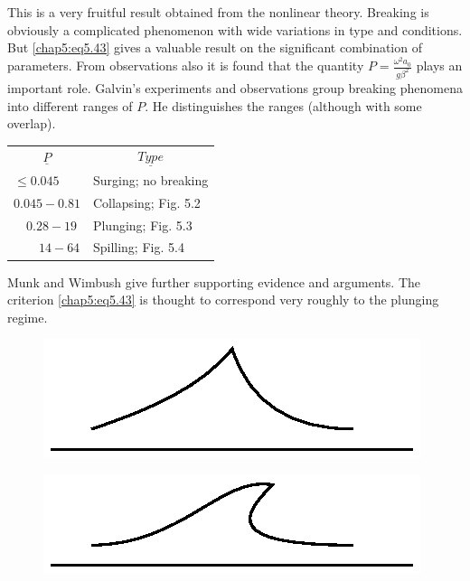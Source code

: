This is a very fruitful result obtained from the nonlinear theory. Breaking is obviously a complicated phenomenon with wide variations in type and conditions. But \eqref{chap5:eq5.43} gives a valuable result on the significant combination of parameters. From observations also it is found that the quantity $P=\frac{\omega^2a_0}{g\beta^2}$ plays an important role. Galvin's experiments and observations \cite{key5} group breaking phenomena into different ranges of $P$. He distinguishes the ranges (although with some overlap).
\begin{center}
\begin{tabular}{ll}
\multicolumn{1}{c}{$\underline{P}$} & \multicolumn{1}{c}{$\underline{Type}$}\\
$\leq 0.045$ & Surging; no breaking\\
$0.045 - 0.81$ & Collapsing; Fig. 5.2\\
$\quad0.28 - 19$ & Plunging; Fig. 5.3\\
$\qquad14 - 64$ & Spilling; Fig. 5.4
\end{tabular}
\end{center}

Munk and Wimbush \cite{key6} give further supporting evidence and arguments. The criterion \eqref{chap5:eq5.43} is thought to correspond very roughly to the plunging regime.

\begin{figure}[H]
\centering
\includegraphics{figures/fig61-5.2.eps}
\caption{}
\label{chap1:fig5.2}
\end{figure}



\begin{figure}[H]
\centering
\includegraphics{figures/fig61-5.3.eps}
\caption{}
\label{chap1:fig5.3}
\end{figure}



